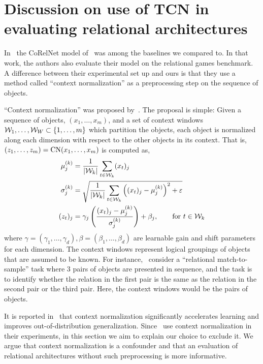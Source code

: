 \section{Discussion on use of TCN in evaluating relational architectures}\label{sec:appendix_tcn_discussion}

In~ the CoRelNet model of~\citet{kergNeuralArchitecture2022} was among the baselines we compared to. In that work, the authors also evaluate their model on the relational games benchmark. A difference between their experimental set up and ours is that they use a method called ``context normalization'' as a preprocessing step on the sequence of objects.

``Context normalization'' was proposed by~\citet{webbLearningRepresentationsThat2020}. The proposal is simple: Given a sequence of objects, $(x_1, \ldots, x_m)$, and a set of context windows ${\mathcal{W}}_1, \ldots, {\mathcal{W}}_W \subset \left\{1, \ldots, m\right\}$ which partition the objects, each object is normalized along each dimension with respect to the other objects in its context. That is, $\left(z_1, \ldots, z_m\right) = \mathrm{CN}(x_1, \ldots, x_m)$ is computed as,
\begin{eqnarray*}
    \begin{split}
        \mu_j^{(k)} &= \frac{1}{\left\lvert{\mathcal{W}}_k\right\rvert} \sum_{t \in {\mathcal{W}}_k} (x_t)_j\\
        \sigma_j^{(k)} &= \sqrt{ \frac{1}{\left\lvert{\mathcal{W}}_k\right\rvert} \sum_{t \in {\mathcal{W}}_k} \left((x_t)_j - \mu_j^{(k)}\right)^2 + \varepsilon}\\
        (z_t)_j &= \gamma_j \left(\frac{(x_t)_j - \mu_j^{(k)}}{\sigma_j^{(k)}}\right) + \beta_j, \qquad \text{for } t \in {\mathcal{W}}_k
    \end{split}
\end{eqnarray*}
where $\gamma = (\gamma_1, \ldots, \gamma_d), \beta = (\beta_1, \ldots, \beta_d)$ are learnable gain and shift parameters for each dimension. The context windows represent logical groupings of objects that are assumed to be known. For instance,~\citep{webbEmergentSymbols2021,kergNeuralArchitecture2022} consider a ``relational match-to-sample'' task where 3 pairs of objects are presented in sequence, and the task is to identify whether the relation in the first pair is the same as the relation in the second pair or the third pair. Here, the context windows would be the pairs of objects.

It is reported in~\citep{webbEmergentSymbols2021,kergNeuralArchitecture2022} that context normalization significantly accelerates learning and improves out-of-distribution generalization. Since~\citep{webbEmergentSymbols2021,kergNeuralArchitecture2022} use context normalization in their experiments, in this section we aim to explain our choice to exclude it. We argue that context normalization is a confounder and that an evaluation of relational architectures without such preprocessing is more informative.

